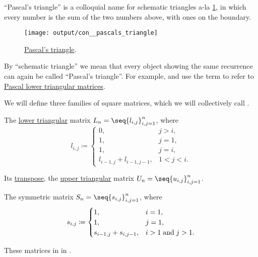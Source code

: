 \begin{concept}\label{con:pascals_triangle}
  \enquote{Pascal's triangle} is a colloquial name for schematic triangles a-la \cref{fig:con:pascals_triangle}, in which every number is the sum of the two numbers above, with ones on the boundary.

  \begin{figure}[!ht]
    \centering
    \texttt{[image: output/con\_\_pascals\_triangle]}
    \caption{\hyperref[con:pascals_triangle]{Pascal's triangle}.}\label{fig:con:pascals_triangle}
  \end{figure}

  By \enquote{schematic triangle} we mean that every object showing the same recurrence can again be called \enquote{Pascal's triangle}. For example,  and  use the term to refer to \hyperref[def:pascal_matrix/lower]{Pascal lower triangular matrices}.
\end{concept}

\begin{definition}\label{def:pascal_matrix}
  We will define three families of square matrices, which we will collectively call .
  \begin{thmenum}
     The \hyperref[def:triangular_matrix]{lower triangular} matrix \( L_n = \seq{ l_{i,j} }_{i,j=1}^n \), where
    \begin{equation*}
      l_{i,j} \coloneqq \begin{cases}
        0,                       &j > i, \\
        1,                       &j = 1, \\
        1,                       &j = i, \\
        l_{i-1,j} + l_{i-1,j-1}, &1 < j < i.
      \end{cases}
    \end{equation*}

     Its \hyperref[def:transpose_matrix]{transpose}, the \hyperref[def:triangular_matrix]{upper triangular} matrix \( U_n = \seq{ u_{i,j} }_{i,j=1}^n \).

     The symmetric matrix \( S_n = \seq{ s_{i,j} }_{i,j=1}^n \), where
    \begin{equation*}
      s_{i,j} \coloneqq \begin{cases}
        1,                     &i = 1, \\
        1,                     &j = 1, \\
        s_{i-1,j} + s_{i,j-1}, &i > 1 \T{and} j > 1.
      \end{cases}
    \end{equation*}
  \end{thmenum}
\end{definition}
\begin{comments}
  \item These matrices in  in \cite{code}.
\end{comments}

